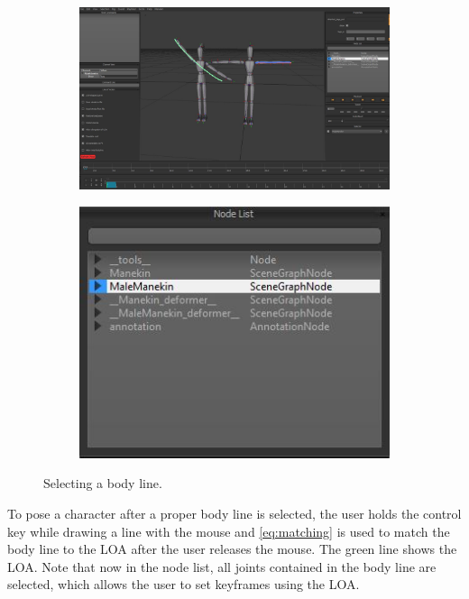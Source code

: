 \begin{figure}[h!]
	\centering
        \begin{subfigure}[b!]{0.45\textwidth}
        	\centering
                \includegraphics[width=\linewidth]{img/ui}
        \end{subfigure}
        \quad
        \begin{subfigure}[b!]{0.45\textwidth}
        	\centering
                \includegraphics[width=\linewidth]{img/ui2}
        \end{subfigure}%
        \caption{Selecting a body line.}
	\label{fig:selection}
\end{figure}

To pose a character after a proper body line is selected, the user holds the control key while drawing a line with the mouse and \autoref{eq:matching} is used to match the body line to the LOA after the user releases the mouse. The green line shows the LOA. Note that now in the node list, all joints contained in the body line are selected, which allows the user to set keyframes using the LOA.

